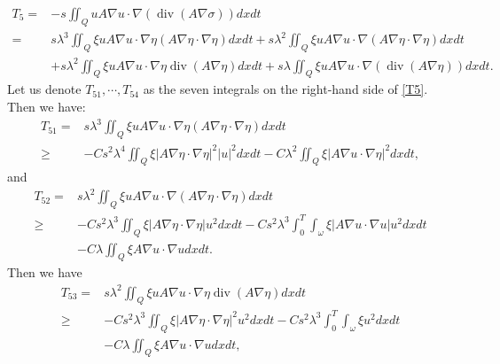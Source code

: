 \documentclass[9pt,reqno]{amsart}
\theoremstyle{plain}
\numberwithin{equation}{section}
\numberwithin{theorem}{section}
\DeclareMathOperator*{\Div}{\mathrm{div}}
\begin{document}
	\begin{equation}\label{T5}
		\begin{split}
			T_5  =&-s \iint_Q u A \nabla u \cdot \nabla(\Div(A \nabla \sigma)) dx  dt\\
			=&s \lambda^3 \iint_Q \xi u A \nabla u \cdot \nabla \eta \left( A \nabla \eta \cdot \nabla \eta\right)  dx  dt
			+ s \lambda^2 \iint_Q \xi u A \nabla u \cdot \nabla\left(A \nabla \eta \cdot \nabla \eta\right) dx  dt \\
			& +s \lambda^2 \iint_Q \xi u A \nabla u \cdot \nabla \eta \Div(A \nabla \eta)   dx  dt+s \lambda \iint_Q \xi u A \nabla u \cdot \nabla(\Div(A \nabla \eta)) dx  dt.
		\end{split}
	\end{equation}
	Let us denote $T_{51}, \cdots, T_{54}$ as the seven integrals on the right-hand side of \eqref{T5}. Then we have:
	\begin{equation}\label{T51}
		\begin{split}
			T_{51}=&s \lambda^3 \iint_Q \xi u A \nabla u \cdot \nabla \eta \left( A \nabla \eta \cdot \nabla \eta\right)  dx  dt\\
			\geq&
			-Cs^2 \lambda^4 \iint_Q \xi\left|A \nabla \eta \cdot \nabla \eta\right|^2|u|^2 dx  dt
			-C\lambda^2 \iint_Q \xi| A\nabla u \cdot\nabla \eta|^2 dx  dt,
		\end{split}
	\end{equation}
	and
	\begin{equation}\label{T52}
		\begin{split}
			T_{52}=&s \lambda^2 \iint_Q \xi u A \nabla u \cdot \nabla\left(A \nabla \eta \cdot \nabla \eta\right) dx  dt\\
			\ge&-Cs^2 \lambda^3\iint_{Q} \xi \left| A \nabla \eta \cdot \nabla \eta \right| u^2 dx  dt -Cs^2 \lambda^3\int_0^T \int_{\omega} \xi \left| A \nabla u \cdot \nabla u \right|  u^2 dx  dt\\
			&- C\lambda \iint_Q  \xi A \nabla u \cdot \nabla u dx  dt.
		\end{split}
	\end{equation}
	Then we have
	\begin{equation}\label{T53}
		\begin{split}
			T_{53}=&s \lambda^2 \iint_Q \xi u A \nabla u \cdot \nabla \eta  \Div(A \nabla \eta) dx  dt\\
			\ge& -Cs^2 \lambda^3\iint_Q \xi \left| A \nabla \eta \cdot \nabla \eta \right|^2  u^2  dx  dt -Cs^2 \lambda^3\int_0^T \int_{\omega} \xi u^2 dx  dt\\
			&- C\lambda \iint_Q \xi A \nabla u \cdot \nabla u dx  dt,
		\end{split}
	\end{equation}
\end{document}
